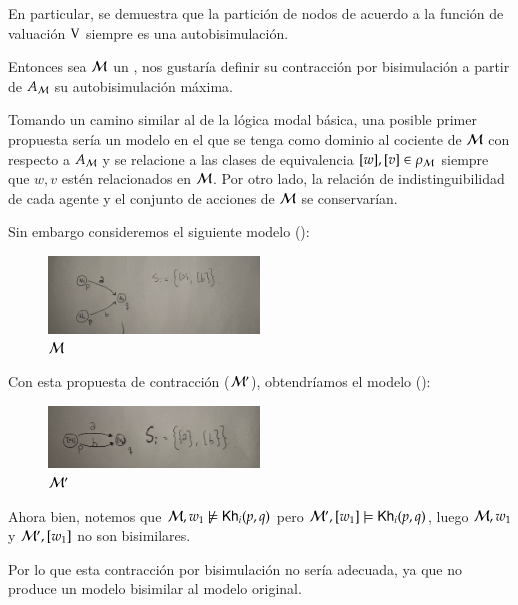 En particular, se demuestra que la partición de nodos de acuerdo a la función de valuación $\mathrm{V}$ siempre es una autobisimulación.

Entonces sea $\mathcal{M}$ un \ults, nos gustaría definir su contracción por bisimulación a partir de $A_{\mathcal{M}}$ su autobisimulación máxima.

Tomando un camino similar al de la lógica modal básica, una posible primer propuesta sería un modelo en el que se tenga como dominio al cociente 
de $\mathcal{M}$ con respecto a $A_{\mathcal{M}}$ y se relacione a las clases de equivalencia $[w], [v] \in \rho_{\mathcal{M}}$ siempre que 
$w, v$ estén relacionados en $\mathcal{M}$. Por otro lado, la relación de indistinguibilidad de cada agente y el conjunto de acciones de $\mathcal{M}$ se conservarían.

Sin embargo consideremos el siguiente modelo ():

\begin{figure}[h]
    \centering
    \includegraphics[width=0.5\textwidth]{imagenes/1ra_propuesta_original.jpeg}
    \caption{$\mathcal{M}$}
    \label{fig:1stproposaloriginal}
\end{figure}

Con esta propuesta de contracción ($\mathcal{M}'$), obtendríamos el modelo ():

\begin{figure}[h]
    \centering
    \includegraphics[width=0.5\textwidth]{imagenes/1ra_propuesta_contraido.jpeg}
    \caption{$\mathcal{M}'$}
    \label{fig:1stproposalcontraction}
\end{figure}


Ahora bien, notemos que $\mathcal{M}, w_1 \not\models \mathsf{Kh}_i(p,q)$ pero $\mathcal{M}', [w_1] \models \mathsf{Kh}_i(p,q)$, luego $\mathcal{M},w_1$ y 
$\mathcal{M}',[w_1]$ no son bisimilares.

Por lo que esta contracción por bisimulación no sería adecuada, ya que no produce un modelo bisimilar al modelo original.


